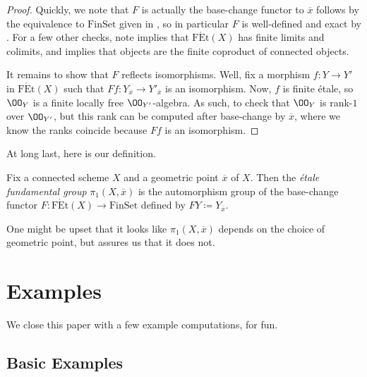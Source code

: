 \documentclass{amsart}
\begin{document}
\mainschemethm*
\begin{proof}
    Quickly, we note that $F$ is actually the base-change functor to $\overline x$ follows by the equivalence to $\mathrm{FinSet}$ given in , so in particular $F$ is well-defined and exact by . For a few other checks, note  implies that $\mathrm{F\acute Et}(X)$ has finite limits and colimits, and  implies that objects are the finite coproduct of connected objects.

    It remains to show that $F$ reflects isomorphisms. Well, fix a morphism $f\colon Y\to Y'$ in $\mathrm{F\acute Et}(X)$ such that $Ff\colon Y_{\overline x}\to Y'_{\overline x}$ is an isomorphism.
    Now, $f$ is finite \'etale, so $\OO_{Y}$ is a finite locally free $\OO_{Y'}$-algebra. As such, to check that $\OO_Y$ is rank-$1$ over $\OO_{Y'}$, but this rank can be computed after base-change by $\overline x$, where we know the ranks coincide because $Ff$ is an isomorphism.
\end{proof}
At long last, here is our definition.
\begin{definition}
    Fix a connected scheme $X$ and a geometric point $\overline x$ of $X$. Then the \textit{\'etale fundamental group} $\pi_1(X,\overline x)$ is the automorphism group of the base-change functor $F\colon\mathrm{F\acute Et}(X)\to\mathrm{FinSet}$ defined by $FY\coloneqq Y_{\overline x}$.
\end{definition}
\begin{remark}
    One might be upset that it looks like $\pi_1(X,\overline x)$ depends on the choice of geometric point, but  assures us that it does not.
\end{remark}

\section{Examples} \label{sec:examples}
We close this paper with a few example computations, for fun.

\subsection{Basic Examples}
\end{document}

